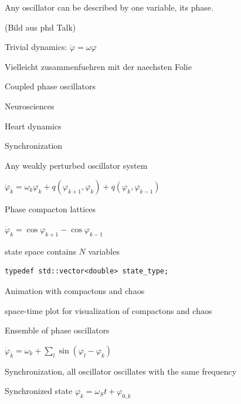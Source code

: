 \begin{frame}[fragile]

 Any oscillator can be described by one variable, its phase.

 (Bild aus phd Talk)

 Trivial dynamics: $\dot{\varphi}=\omega \varphi$

Vielleicht zusammenfuehren mit der naechsten Folie

\end{frame}




\begin{frame}

 Coupled phase oscillators

 Neurosciences

 Heart dynamics

 Synchronization

 Any weakly perturbed oscillator system

 $\dot{\varphi}_k = \omega_k \varphi_k + q( \varphi_{k+1} , \varphi_k ) + q( \varphi_k , \varphi_{k-1} )$

\end{frame}




\begin{frame}[fragile]
 
 Phase compacton lattices

 $\dot{\varphi}_k = \cos \varphi_{k+1} - \cos \varphi_{k-1}$

 state space contains $N$ variables

 \begin{lstlisting}
typedef std::vector<double> state_type;
 \end{lstlisting}

 Animation with compactons and chaos

 space-time plot for visualization of compactons and chaos

\end{frame}





\begin{frame}[fragile]

Ensemble of phase oscillators

$\dot{\varphi}_k = \omega_k + \sum\limits_l \sin( \varphi_l - \varphi_k )$

Synchronization, all oscillator oscillates with the same frequency

Synchronized state $\varphi_k = \omega_S t + \varphi_{0,k} $

\end{frame}



